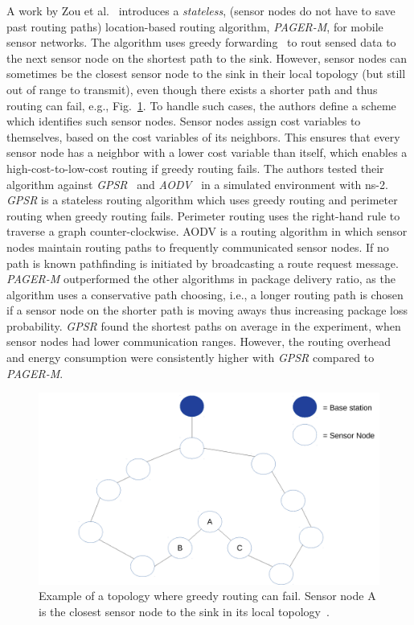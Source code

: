 A work by Zou et al.~\cite{zou2004pager} introduces a \textit{stateless},
(sensor nodes do not have to save past routing paths) location-based routing
algorithm, \textit{PAGER-M}, for mobile sensor networks. The algorithm uses
greedy forwarding~\cite{stojmenovic2001loop} to rout sensed data to the next
sensor node on the shortest path to the sink. However, sensor nodes can
sometimes be the closest sensor node to the sink in their local topology (but
still out of range to transmit), even though there exists a shorter path and
thus routing can fail, e.g., Fig.~\ref{fig:shadow nodes}. To handle such cases,
the authors define a scheme which identifies such sensor nodes. Sensor nodes
assign cost variables to themselves, based on the cost variables of its
neighbors. This ensures that every sensor node has a neighbor with a lower cost
variable than itself, which enables a high-cost-to-low-cost routing if greedy
routing fails. The authors tested their algorithm against
\textit{GPSR}~\cite{karp2000gpsr} and \textit{AODV}~\cite{perkins2003ad} in a
simulated environment with ns-2. \textit{GPSR} is a stateless routing algorithm
which uses greedy routing and perimeter routing when greedy routing fails.
Perimeter routing uses the right-hand rule to traverse a graph
counter-clockwise. AODV is a routing algorithm in which sensor nodes maintain
routing paths to frequently communicated sensor nodes. If no path is known
pathfinding is initiated by broadcasting a route request message.
\textit{PAGER-M} outperformed the other algorithms in package delivery ratio,
as the algorithm uses a conservative path choosing, i.e., a longer routing path
is chosen if a sensor node on the shorter path is moving aways thus increasing
package loss probability. \textit{GPSR} found the shortest paths on average in
the experiment, when sensor nodes had lower communication ranges. However, the
routing overhead and energy consumption were consistently higher with
\textit{GPSR} compared to \textit{PAGER-M}.

\begin{figure}[h]
\includegraphics[width=\linewidth]{images/pager-shadow-nodes.pdf}
\caption{Example of a topology where greedy routing can fail. Sensor node A is
the closest sensor node to the sink in its local topology~\cite{zou2004pager}.}
\label{fig:shadow nodes}
\centering
\end{figure}

